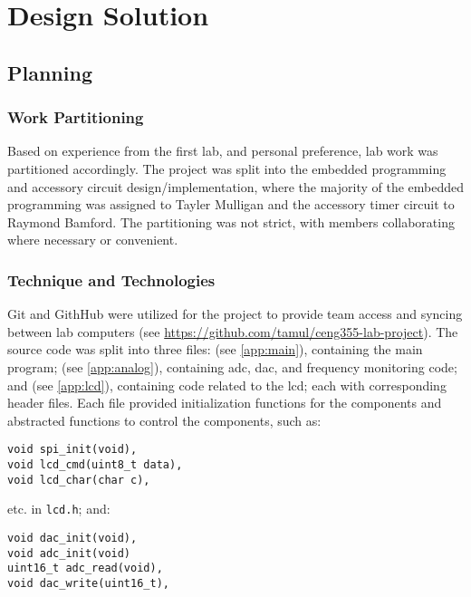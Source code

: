 
\section{Design Solution}
\subsection{Planning}
\subsubsection{Work Partitioning}
Based on experience from the first lab, and personal preference, lab
work was partitioned accordingly. The project was split into the
embedded programming and accessory circuit design/implementation, where
the majority of the embedded programming was assigned to Tayler Mulligan
and the accessory timer circuit to Raymond Bamford. The partitioning was
not strict, with members collaborating where necessary or convenient.

\subsubsection{Technique and Technologies}
Git and GithHub were utilized for the project to provide team access and
syncing between lab computers (see
\url{https://github.com/tamul/ceng355-lab-project}). The source code was
split into three files:  (see \ref{app:main}), containing the main program;
 (see \ref{app:analog}), containing \gls{adc},
\gls{dac}, and frequency monitoring
code; and  (see \ref{app:lcd}), containing code related
to the \gls{lcd}; each with corresponding header files. Each file
provided initialization functions for the components and abstracted
functions to control the components, such as:

\begin{lstlisting}[numbers=none]
void spi_init(void),
void lcd_cmd(uint8_t data),
void lcd_char(char c),
\end{lstlisting}

etc. in \lstinline{lcd.h}; and:

\begin{lstlisting}[numbers=none]
void dac_init(void),
void adc_init(void)
uint16_t adc_read(void),
void dac_write(uint16_t),
\end{lstlisting}

